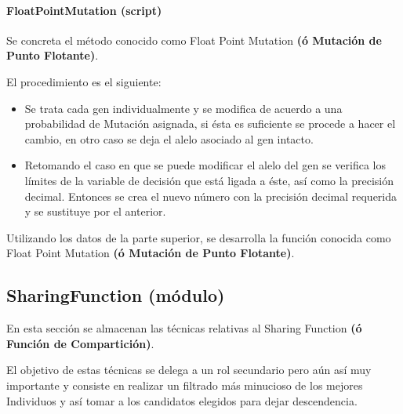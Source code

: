 \documentclass[letterpaper,10pt,english]{sphinxmanual}
\begin{document}
\paragraph{FloatPointMutation (script)}
\label{Model/Operator/Mutation/FloatPointMutation:floatpointmutation-script}\label{Model/Operator/Mutation/FloatPointMutation::doc}
\begin{DUlineblock}{0em}
\item[] Se concreta el método conocido como Float Point Mutation \textbf{(ó Mutación de Punto Flotante)}.
\item[] El procedimiento es el siguiente:
\end{DUlineblock}
\begin{itemize}
\item {} 
Se trata cada gen individualmente y se modifica de acuerdo a una probabilidad de Mutación asignada, si ésta es suficiente se procede a hacer el cambio, en otro caso se deja el alelo asociado al gen intacto.

\item {} 
Retomando el caso en que se puede modificar el alelo del gen se verifica los límites de la variable de decisión que está ligada a éste, así como la precisión decimal. Entonces se crea el nuevo número con la precisión decimal requerida y se sustituye por el anterior.

\end{itemize}
\label{Model/Operator/Mutation/FloatPointMutation:module-Model.Operator.Mutation.FloatPointMutation}

\begin{fulllineitems}
\label{Model/Operator/Mutation/FloatPointMutation:Model.Operator.Mutation.FloatPointMutation.execute_mutation_technique}
Utilizando los datos de la parte superior, se desarrolla la función
conocida como Float Point Mutation \textbf{(ó Mutación de Punto Flotante)}.

\end{fulllineitems}



\subsection{SharingFunction (módulo)}
\label{Model/SharingFunction/SharingFunction:sharingfunction-modulo}\label{Model/SharingFunction/SharingFunction::doc}
\begin{DUlineblock}{0em}
\item[] En esta sección se almacenan las técnicas relativas al Sharing Function
\textbf{(ó Función de Compartición)}.
\item[] El objetivo de estas técnicas se delega a un rol secundario pero aún así
muy importante y consiste en realizar un filtrado más minucioso de los mejores Individuos
y así tomar a los candidatos elegidos para dejar descendencia.
\end{DUlineblock}
\end{document}
